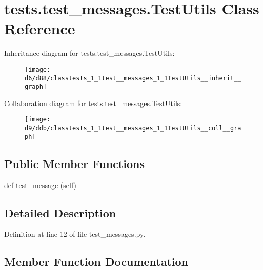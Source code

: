 \hypertarget{classtests_1_1test__messages_1_1TestUtils}{}\section{tests.\+test\+\_\+messages.\+Test\+Utils Class Reference}
\label{classtests_1_1test__messages_1_1TestUtils}


Inheritance diagram for tests.\+test\+\_\+messages.\+Test\+Utils\+:
\nopagebreak
\begin{figure}[H]
\begin{center}
\leavevmode
\texttt{[image: d6/d88/classtests\_1\_1test\_\_messages\_1\_1TestUtils\_\_inherit\_\_graph]}
\end{center}
\end{figure}


Collaboration diagram for tests.\+test\+\_\+messages.\+Test\+Utils\+:
\nopagebreak
\begin{figure}[H]
\begin{center}
\leavevmode
\texttt{[image: d9/ddb/classtests\_1\_1test\_\_messages\_1\_1TestUtils\_\_coll\_\_graph]}
\end{center}
\end{figure}
\subsection*{Public Member Functions}
\begin{DoxyCompactItemize}
\item 
def \hyperlink{classtests_1_1test__messages_1_1TestUtils_ab43cf75c46098c2d2bd7ee061c93be96}{test\+\_\+message} (self)
\end{DoxyCompactItemize}


\subsection{Detailed Description}


Definition at line 12 of file test\+\_\+messages.\+py.



\subsection{Member Function Documentation}
\mbox{\label{classtests_1_1test__messages_1_1TestUtils_ab43cf75c46098c2d2bd7ee061c93be96}} 
